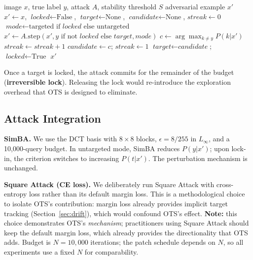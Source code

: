 \documentclass{cap2026}
\begin{document}
\begin{algorithm}[t]
\caption{Opportunistic Target Selection (Rank-Stability Variant)}
\label{alg:ot}
\begin{algorithmic}[1]
\Require image $x$, true label $y$, attack $A$, stability threshold $S$
\Ensure adversarial example $x'$
\State $x' \leftarrow x$, $\textit{locked} \leftarrow \text{False}$, $\textit{target} \leftarrow \text{None}$, $\textit{candidate} \leftarrow \text{None}$, $\textit{streak} \leftarrow 0$
    \State $\textit{mode} \leftarrow \text{targeted if } \textit{locked} \text{ else untargeted}$
    \State $x' \leftarrow A.\text{step}(x', y \text{ if not } \textit{locked} \text{ else } \textit{target}, \textit{mode})$
        \State $c \leftarrow \arg\max_{k \neq y} P(k | x')$
             $\textit{streak} \leftarrow \textit{streak} + 1$
            \Else{} $\textit{candidate} \leftarrow c$; $\textit{streak} \leftarrow 1$
            \EndIf
             $\textit{target} \leftarrow \textit{candidate}$; $\textit{locked} \leftarrow \text{True}$
            \EndIf
        \EndIf
    \EndIf
\EndWhile
\State \Return $x'$
\end{algorithmic}
\end{algorithm}

Once a target is locked, the attack commits for the remainder of the budget (\textbf{irreversible lock}). Releasing the lock would re-introduce the exploration overhead that OTS is designed to eliminate.

\subsection{Attack Integration}\label{sec:integration}

\textbf{SimBA.} We use the DCT basis with $8\times8$ blocks, $\epsilon = 8/255$ in $L_\infty$, and a 10,000-query budget. In untargeted mode, SimBA reduces $P(y|x')$; upon lock-in, the criterion switches to increasing $P(t|x')$. The perturbation mechanism is unchanged.

\textbf{Square Attack (CE loss).} We deliberately run Square Attack with cross-entropy loss rather than its default margin loss. This is a methodological choice to isolate OTS's contribution: margin loss already provides implicit target tracking (Section~\ref{sec:drift}), which would confound OTS's effect. \textbf{Note:} this choice demonstrates OTS's \emph{mechanism}; practitioners using Square Attack should keep the default margin loss, which already provides the directionality that OTS adds. Budget is $N = 10{,}000$ iterations; the patch schedule depends on $N$, so all experiments use a fixed $N$ for comparability.
\end{document}
